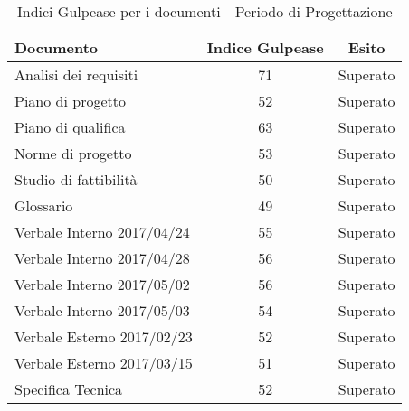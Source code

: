       
      \begin{table}[H]
        \centering
        \begin{tabular}{|l|c|c|}
          \hline
          \textbf{Documento} &\textbf{Indice Gulpease} &\textbf{Esito}\\
          \hline
          Analisi dei requisiti &71  &Superato \\
          Piano di progetto &52  &Superato \\
          Piano di qualifica  &63  &Superato \\
          Norme di progetto &53  &Superato \\
          Studio di fattibilità &50  &Superato \\
          Glossario &49  &Superato  \\
          Verbale Interno 2017/04/24 &55  &Superato \\
          Verbale Interno 2017/04/28 &56 &Superato \\
          Verbale Interno 2017/05/02 &56  &Superato \\
          Verbale Interno 2017/05/03 &54  &Superato \\
          Verbale Esterno 2017/02/23 &52 &Superato \\
          Verbale Esterno 2017/03/15 &51 &Superato \\
          Specifica Tecnica & 52 & Superato\\
          \hline
        \end{tabular}
        \caption{Indici Gulpease per i documenti - Periodo di Progettazione}
      \end{table}

